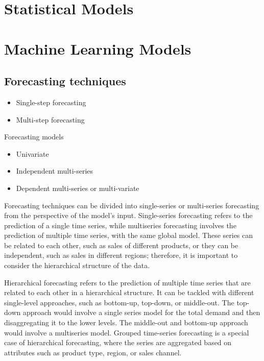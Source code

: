

\section{Statistical Models}
\label{sec:statistical_models}



\section{Machine Learning Models}
\label{sec:machine_learning_models}


\subsection{Forecasting techniques} \label{subsec:forecasting-techniques}
\begin{itemize}
    \item Single-step forecasting
    \item Multi-step forecasting
\end{itemize}

Forecasting models
\begin{itemize}
    \item Univariate
    \item Independent multi-series
    \item Dependent multi-series or multi-variate
\end{itemize}

Forecasting techniques can be divided into single-series or multi-series forecasting from the perspective of the model's input.
Single-series forecasting refers to the prediction of a single time series, while multiseries forecasting involves the prediction of multiple time series, with the same global model\cite{joachim2023demand}.
These series can be related to each other, such as sales of different products, or they can be independent, such as sales in different regions; therefore, it is important to consider the hierarchical structure of the data.




Hierarchical forecasting refers to the prediction of multiple time series that are related to each other in a hierarchical structure\cite{hyndman2018forecasting}.
It can be tackled with different single-level approaches, such as bottom-up, top-down, or middle-out\cite{hyndman2018forecasting}.
The top-down approach would involve a single series model for the total demand and then disaggregating it to the lower levels.
The middle-out and bottom-up approach would involve a multiseries model.
Grouped time-series forecasting is a special case of hierarchical forecasting, where the series are aggregated based on attributes such as product type, region, or sales channel.

